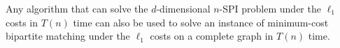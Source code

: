 



\begin{lemma}\label{lemma:kSPI_reduction}
Any algorithm that can solve the $d$-dimensional $n$-SPI problem under the $\ell_1$ costs in $T(n)$ time can also be used to solve an instance of minimum-cost bipartite matching under the $\ell_1$ costs on a complete graph in $T(n)$ time.
\end{lemma} 










